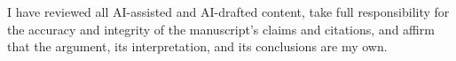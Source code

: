 \documentclass[12pt, a4paper]{article}
\begin{document}
I have reviewed all AI-assisted and AI-drafted content, take full responsibility for the
accuracy and integrity of the manuscript's claims and citations, and affirm that the
argument, its interpretation, and its conclusions are my own.


\end{document}

